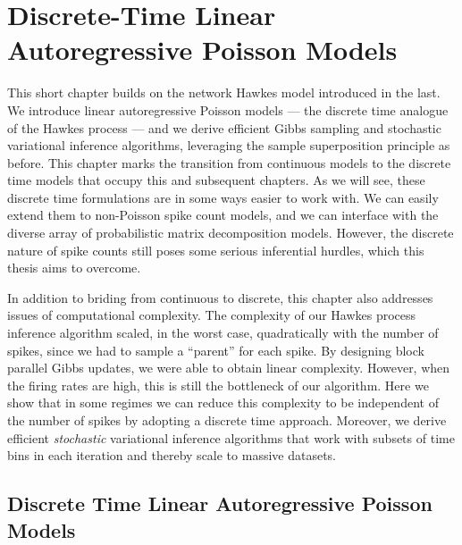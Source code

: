 \chapter{Discrete-Time Linear Autoregressive Poisson Models}
\label{chap:four}

This short chapter builds on the network Hawkes model introduced in
the last. We introduce linear autoregressive Poisson models --- the discrete time analogue of the Hawkes process --- and we derive efficient Gibbs sampling
and stochastic variational inference algorithms, leveraging the sample
superposition principle as before. This chapter marks the transition
from continuous models to the discrete time models that occupy this
and subsequent chapters. As we will see, these discrete time formulations
are in some ways easier to work with. We can easily extend them to non-Poisson
spike count models, and we can interface with the diverse array of
probabilistic matrix decomposition models. However, the discrete
nature of spike counts still poses some serious inferential hurdles,
which this thesis aims to overcome.

In addition to briding from continuous to discrete, this chapter also
addresses issues of computational complexity. The complexity of our Hawkes process
inference algorithm scaled, in the worst case, quadratically with the
number of spikes, since we had to sample a ``parent'' for each spike.
By designing block parallel Gibbs updates, we were able
to obtain linear complexity. However, when the firing rates are high,
this is still the bottleneck of our algorithm. Here we show that in
some regimes we can reduce this complexity to be independent
of the number of spikes by adopting a discrete time approach.
Moreover, we derive efficient \emph{stochastic} variational inference
algorithms that work with subsets of time bins in each iteration
and thereby scale to massive datasets.


\section{Discrete Time Linear Autoregressive Poisson Models}

